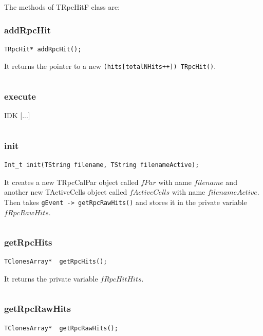 \documentclass[a4paper]{book}
\begin{document}
The methods of TRpcHitF class are:

\subsubsection{addRpcHit}

\begin{lstlisting}[style=customc]
TRpcHit* addRpcHit();
\end{lstlisting}

It returns the pointer to a new \texttt{(hits[totalNHits++]) TRpcHit()}.

\[\]

\subsubsection{execute}

IDK [...]

\[\]

\subsubsection{init}

\begin{lstlisting}[style=customc]
Int_t init(TString filename, TString filenameActive);
\end{lstlisting}

It creates a new TRpcCalPar object called $fPar$ with name $filename$ and another new TActiveCells object called $fActiveCells$ with name $filenameActive$. Then takes \texttt{gEvent -> getRpcRawHits()} and stores it in the private variable $fRpcRawHits$.

\[\]

\subsubsection{getRpcHits}

\begin{lstlisting}[style=customc]
TClonesArray*  getRpcHits();
\end{lstlisting}

It returns the private variable $fRpcHitHits$.

\[\]

\subsubsection{getRpcRawHits}

\begin{lstlisting}[style=customc]
TClonesArray*  getRpcRawHits();
\end{lstlisting}
\end{document}
